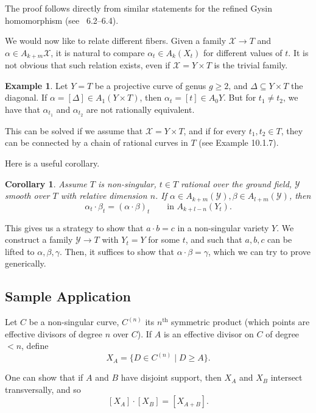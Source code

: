 \documentclass[leqno, openany]{memoir}
\newtheorem{cor}[thm]{Corollary}
\theoremstyle{definition}
\newtheorem{exm}[thm]{Example}
\theoremstyle{remark}
\theoremstyle{plain}
\theoremstyle{definition}
\theoremstyle{remark}
\newcommand{\mc}[1]{\mathcal{#1}}
\begin{document}
The proof follows directly from similar statements for the refined Gysin homomorphism (see \textsection~6.2--6.4).

We would now like to relate different fibers. Given a family $\mc{X} \to T$ and $\alpha \in A_{k+m}\mc{X}$, it is natural to compare $\alpha_t \in A_k(X_t)$ for different values of $t$. It is not obvious that such relation exists, even if $\mc{X}=Y \times T$ is the trivial family.

\begin{exm}
Let $Y=T$ be a projective curve of genus $g \geq 2$, and $\Delta\subseteq Y \times T$ the diagonal. If $\alpha = [\Delta] \in A_1(Y \times T)$, then $\alpha_t = [t] \in A_0 Y$. But for $t_1 \neq t_2$, we have that $\alpha_{t_1}$ and $\alpha_{t_2}$ are not rationally equivalent. 
\end{exm}

This can be solved if we assume that $\mc{X}=Y \times T$, and if for every $t_1, t_2 \in T$, they can be connected by a chain of rational curves in $T$ (see Example 10.1.7).

Here is a useful corollary.
\begin{cor}\label{cor:intfiber}
Assume $T$ is non-singular, $t \in T$ rational over the ground field, $\mc{Y}$ smooth over $T$ with relative dimension $n$. If $\alpha \in A_{k+m}(\mc{Y}), \beta \in A_{l+m}(\mc{Y})$, then 
\[ \alpha_t \cdot \beta_t = { (\alpha \cdot \beta) }_t \qquad \text{in } A_{k+l-n}(Y_t). \]
\end{cor}

This gives us a strategy to show that $a \cdot b=c$ in a non-singular variety $Y$. We construct a family $\mc{Y} \to T$ with $Y_t=Y$ for some $t$, and such that $a, b, c$ can be lifted to $\alpha, \beta, \gamma$. Then, it suffices to show that $\alpha \cdot \beta=\gamma$, which we can try to prove generically.

\subsection{Sample Application}%
\label{sub:sample_application}


Let $C$ be a non-singular curve, $C^{(n)}$ its $n^{\text{th}}$ symmetric product (which points are effective divisors of degree $n$ over $C$). If $A$ is an effective divisor on $C$ of degree $<n$, define
\[ X_A=\{D \in C^{(n)} \mid D \geq A \}. \]

One can show that if $A$ and $B$ have disjoint support, then $X_A$ and $X_B$ intersect transversally, and so
\[ [X_A] \cdot [X_B]=[X_{A+B}]. \]
\end{document}
